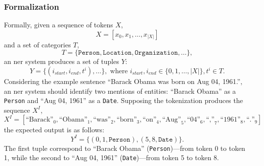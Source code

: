 \subsubsection{Formalization}
Formally, given a sequence of tokens $X$,
\begin{equation}
    X = [x_0, x_1, \ldots, x_{|X|}]
\end{equation}
and a set of categories $T$,
\begin{equation}
T = \{\texttt{Person}, \texttt{Location}, \texttt{Organization}, \ldots\},
\end{equation}
an \ac{ner} system produces a set of tuples $Y$:
\begin{equation}
Y = \{(i_{start},i_{end},t^i),\ldots\}, \text{ where } i_{start}, i_{end} \in \{0,1,\ldots,|X|\}, t^i \in T.
\end{equation}
Considering the example sentence ``Barack Obama was born on Aug 04, 1961.'', an \ac{ner} system should identify two mentions of entities: ``Barack Obama'' as a \texttt{Person} and ``Aug 04, 1961'' as a \texttt{Date}. Supposing the tokenization produces the sequence $X^I$,
\begin{equation}
X^I = [\text{``Barack''}_0, \text{``Obama''}_1, \text{``was''}_2, \text{``born''}_3, 
       \text{``on''}_4, \text{``Aug''}_5, \text{``04''}_6, \text{``,''}_7, 
       \text{``1961''}_8, \text{``.''}_9]
\end{equation}
the expected output is as follows:
\begin{equation}
Y^I = \{(0, 1, \texttt{Person}), (5, 8, \texttt{Date})\}.
\end{equation}
The first tuple correspond to ``Barack Obama'' (\texttt{Person})---from token 0 to token 1, while the second to ``Aug 04, 1961'' (\texttt{Date})---from token 5 to token 8.

